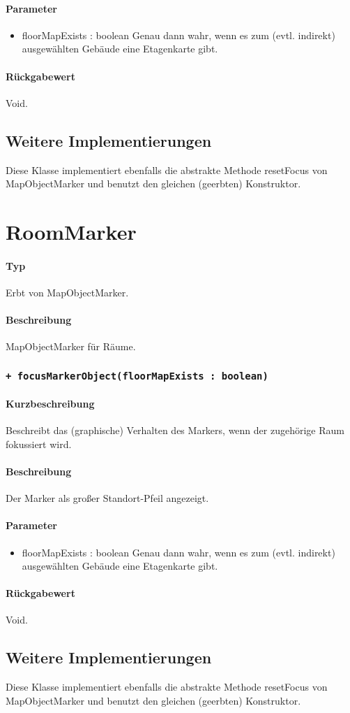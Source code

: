 \paragraph*{Parameter}
\begin{itemize}
    \item floorMapExists : boolean Genau dann wahr, wenn es zum (evtl. indirekt) ausgewählten Gebäude eine Etagenkarte gibt.
\end{itemize}
\paragraph*{Rückgabewert}
Void.

\subsection{Weitere Implementierungen}
Diese Klasse implementiert ebenfalls die abstrakte Methode resetFocus von MapObjectMarker 
und benutzt den gleichen (geerbten) Konstruktor.

\section{RoomMarker}
\paragraph*{Typ} 
Erbt von MapObjectMarker.
\paragraph*{Beschreibung}
MapObjectMarker für Räume.

\subsubsection{\texttt{+ focusMarkerObject(floorMapExists : boolean)}}%
\paragraph*{Kurzbeschreibung}
Beschreibt das (graphische) Verhalten des Markers, wenn der zugehörige Raum fokussiert wird.
\paragraph*{Beschreibung}
Der Marker als großer Standort-Pfeil angezeigt.
\paragraph*{Parameter}
\begin{itemize}
    \item floorMapExists : boolean Genau dann wahr, wenn es zum (evtl. indirekt) ausgewählten Gebäude eine Etagenkarte gibt.
\end{itemize}
\paragraph*{Rückgabewert}
Void.

\subsection{Weitere Implementierungen}
Diese Klasse implementiert ebenfalls die abstrakte Methode resetFocus von MapObjectMarker 
und benutzt den gleichen (geerbten) Konstruktor.
